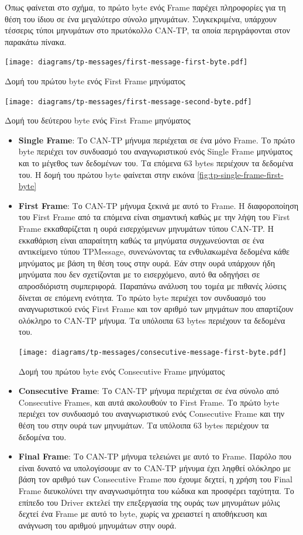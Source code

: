 \documentclass[a4paper,nobib,justified]{tufte-book}
\begin{document}
Όπως φαίνεται στο σχήμα, το πρώτο byte ενός Frame παρέχει πληροφορίες για τη θέση του ίδιου σε ένα μεγαλύτερο σύνολο μηνυμάτων. Συγκεκριμένα, υπάρχουν τέσσερις τύποι μηνυμάτων στο πρωτόκολλο CAN-TP, τα οποία περιγράφονται στον παρακάτω πίνακα.

\begin{marginfigure}
	\centering
	\texttt{[image: diagrams/tp-messages/first-message-first-byte.pdf]}
	\label{fig:tp-first-frame-first-byte}
	\caption{Δομή του πρώτου byte ενός First Frame μηνύματος}
	\goodbreak
	\texttt{[image: diagrams/tp-messages/first-message-second-byte.pdf]}
	\label{fig:tp-first-frame-second-byte}
	\caption{Δομή του δεύτερου byte ενός First Frame μηνύματος}
\end{marginfigure}

\begin{itemize}
	\item \textbf{Single Frame}: Το CAN-TP μήνυμα περιέχεται σε ένα μόνο Frame. Το πρώτο byte περιέχει τον συνδυασμό του αναγνωριστικού ενός Single Frame μηνύματος και το μέγεθος των δεδομένων του. Τα επόμενα 63 bytes περιέχουν τα δεδομένα του. Η δομή του πρώτου byte φαίνεται στην εικόνα \ref{fig:tp-single-frame-first-byte}
	\item \textbf{First Frame}: Το CAN-TP μήνυμα ξεκινά με αυτό το Frame. Η διαφοροποίηση του First Frame από τα επόμενα είναι σημαντική καθώς με την λήψη του First Frame εκκαθαρίζεται η ουρά εισερχόμενων μηνυμάτων τύπου CAN-TP. Η εκκαθάριση είναι απαραίτητη καθώς τα μηνύματα συγχωνεύονται σε ένα αντικείμενο τύπου TPMessage, συνενώνοντας τα ενθυλακωμένα δεδομένα κάθε μηνύματος με βάση τη θέση τους στην ουρά. Εάν στην ουρά υπάρχουν ήδη μηνύματα που δεν σχετίζονται με το εισερχόμενο, αυτό θα οδηγήσει σε απροσδιόριστη συμπεριφορά. Παραπάνω ανάλυση του τομέα με πιθανές λύσεις δίνεται σε επόμενη ενότητα. Το πρώτο byte περιέχει τον συνδυασμό του αναγνωριστικού ενός First Frame και τον αριθμό των μηνμάτων που απαρτίζουν ολόκληρο το CAN-TP μήνυμα. Τα υπόλοιπα 63 bytes περιέχουν τα δεδομένα του.
\begin{marginfigure}
	\centering
	\texttt{[image: diagrams/tp-messages/consecutive-message-first-byte.pdf]}
	\label{fig:tp-consecutive-frame-first-byte}
	\caption{Δομή του πρώτου byte ενός Consecutive Frame μηνύματος}
\end{marginfigure}
	\item \textbf{Consecutive Frame}: Το CAN-TP μήνυμα περιέχεται σε ένα σύνολο από Consecutive Frames, και αυτά ακολουθούν το First Frame. Το πρώτο byte περιέχει τον συνδυασμό του αναγνωριστικού ενός Consecutive Frame και την θέση του στην ουρά των μηνυμάτων. Τα υπόλοιπα 63 bytes περιέχουν τα δεδομένα του.
	\item \textbf{Final Frame}: Το CAN-TP μήνυμα τελειώνει με αυτό το Frame. Παρόλο που είναι δυνατό να υπολογίσουμε αν το CAN-TP μήνυμα έχει ληφθεί ολόκληρο με βάση τον αριθμό των Consecutive Frame που έχουμε δεχτεί, η χρήση του Final Frame διευκολύνει την αναγνωσιμότητα του κώδικα και προσφέρει ταχύτητα. Το επίπεδο του Driver εκτελεί την επεξεργασία της ουράς των μηνυμάτων μόλις δεχτεί ένα Frame με αυτό το byte, χωρίς να χρειαστεί η αποθήκευση και ανάγνωση του αριθμού μηνυμάτων στην ουρά. 
\end{itemize}
\end{document}
